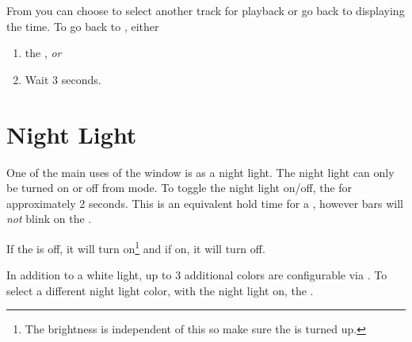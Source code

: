 From  you can choose to select another track for playback or go back
to displaying the time.  To go back to , either

\begin{enumerate}
  \item {} the , \textit{or}
  \item Wait \num{3} seconds.
\end{enumerate}


\section{Night Light} \label{Night Light}

One of the main uses of the  window is as a night light. The night
light can only be turned on or off from  mode.  To toggle the night
light on\slash off,  the  for approximately \num{2} seconds.
This is an equivalent hold time for a , however bars will \textit{not}
blink on the .


If the  is off, it will turn on\footnote{ The brightness is independent
of this so make sure the  is turned up.} and if on, it will turn off.


In addition to a white light, up to \num{3} additional colors are configurable
via \hyperref[Set Night Light]{}.  To select a different night light
color, with the night light on,  the .

